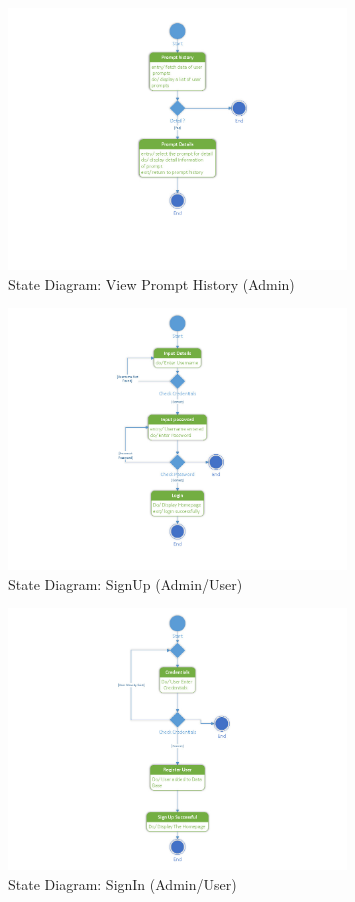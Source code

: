 \documentclass[12pt]{report}
\begin{document}
\begin{figure}[ht]
    \centering
    \includegraphics[width=0.8\textwidth]{Media/Binder2.pdf_Page_14.jpg} %
    \caption{State Diagram: View Prompt History (Admin)}
    \label{fig:drawing1}
\end{figure}

\begin{figure}[ht]
    \centering
    \includegraphics[width=0.8\textwidth]{Media/Binder2.pdf_Page_15.jpg} %
    \caption{State Diagram: SignUp (Admin/User)}
    \label{fig:drawing1}
\end{figure}

\begin{figure}[ht]
    \centering
    \includegraphics[width=0.8\textwidth]{Media/Binder2.pdf_Page_16.jpg} %
    \caption{State Diagram: SignIn (Admin/User)}
    \label{fig:drawing1}
\end{figure}
\end{document}
